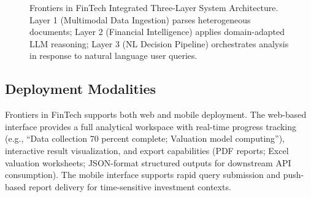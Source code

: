 \documentclass[12pt,letterpaper]{article}
\begin{document}
\begin{figure}[htbp]
{}
  \caption{Frontiers in FinTech Integrated Three-Layer System Architecture.
    Layer 1 (Multimodal Data Ingestion) parses heterogeneous documents;
    Layer 2 (Financial Intelligence) applies domain-adapted LLM reasoning;
    Layer 3 (NL Decision Pipeline) orchestrates analysis in response to
    natural language user queries.}
  \label{fig:architecture}
\end{figure}

\subsection{Deployment Modalities}

Frontiers in FinTech supports both web and mobile deployment.
The web-based interface provides a full analytical workspace with
real-time progress tracking (e.g., ``Data collection 70 percent
complete; Valuation model computing''), interactive result
visualization, and export capabilities (PDF reports; Excel valuation
worksheets; JSON-format structured outputs for downstream API
consumption).
The mobile interface supports rapid query submission and push-based
report delivery for time-sensitive investment contexts.
\end{document}
